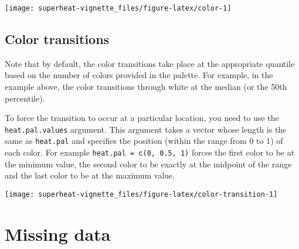\documentclass[]{book}
\newenvironment{Shaded}{\begin{snugshade}}{\end{snugshade}}
\newcommand{\KeywordTok}[1]{\textcolor[rgb]{0.13,0.29,0.53}{\textbf{{#1}}}}
\newcommand{\DataTypeTok}[1]{\textcolor[rgb]{0.13,0.29,0.53}{{#1}}}
\newcommand{\DecValTok}[1]{\textcolor[rgb]{0.00,0.00,0.81}{{#1}}}
\newcommand{\FloatTok}[1]{\textcolor[rgb]{0.00,0.00,0.81}{{#1}}}
\newcommand{\StringTok}[1]{\textcolor[rgb]{0.31,0.60,0.02}{{#1}}}
\newcommand{\CommentTok}[1]{\textcolor[rgb]{0.56,0.35,0.01}{\textit{{#1}}}}
\newcommand{\OtherTok}[1]{\textcolor[rgb]{0.56,0.35,0.01}{{#1}}}
\newcommand{\NormalTok}[1]{{#1}}
\theoremstyle{definition}
\theoremstyle{definition}
\theoremstyle{remark}
\begin{document}
\begin{center}\texttt{[image: superheat-vignette\_files/figure-latex/color-1]} \end{center}

\section{Color transitions}\label{color-transitions}

Note that by default, the color transitions take place at the
appropriate quantile based on the number of colors provided in the
palette. For example, in the example above, the color transitions
through white at the median (or the 50th percentile).

To force the transition to occur at a particular location, you need to
use the \texttt{heat.pal.values} argument. This argument takes a vector
whose length is the same as \texttt{heat.pal} and specifies the position
(within the range from 0 to 1) of each color. For example
\texttt{heat.pal\ =\ c(0,\ 0.5,\ 1)} forces the first color to be at the
minimum value, the second color to be exactly at the midpoint of the
range and the last color to be at the maximum value.

\begin{Shaded}
\end{Shaded}

\begin{center}\texttt{[image: superheat-vignette\_files/figure-latex/color-transition-1]} \end{center}

\chapter{Missing data}\label{missing-data}
\end{document}
